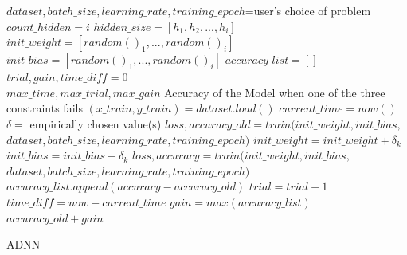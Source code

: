 \begin{algorithm}
	\footnotesize
	\begin{algorithmic}[1]
		\State $dataset,batch\_size, learning\_rate, training\_epoch$=user's choice of problem
		\State $count\_hidden=i$
		\State $hidden\_size=[h_1,h_2,...,h_i]$
		\State $init\_weight=[random()_1,...,random()_i]$
		\State $init\_bias=[random()_1,...,random()_i]$
		\State $accuracy\_list=[]$
		\State $trial,gain,time\_diff=0$\\
		\algorithmicrequire $max\_time, max\_trial, max\_gain$ \newline 
		\algorithmicensure Accuracy of the Model when one of the three constraints fails
		\State	$(x\_train, y\_train)=dataset.load()$
		\State $current\_time=now()$
		\State $\delta=$ empirically chosen value(s)
		\State $loss, accuracy\_old=train(init\_weight,init\_bias,$
					$dataset,batch\_size, learning\_rate, training\_epoch)$
		\State $init\_weight=init\_weight+\delta_k$
		\State $init\_bias=init\_bias+\delta_k$
		\State $loss, accuracy=train(init\_weight,init\_bias,$
		$dataset,batch\_size, learning\_rate, training\_epoch)$
		\State $accuracy\_list.append(accuracy-accuracy\_old)$
		\State $trial=trial+1$
		\State $time\_diff=now-current\_time$
		\State $gain=max(accuracy\_list)$
		\EndWhile
		\EndFor
		\State \Return $accuracy\_old+gain$
		\EndProcedure
	\end{algorithmic} 
	\caption{\footnotesize ADNN}
	\label{algo:adnn}
\end{algorithm}
